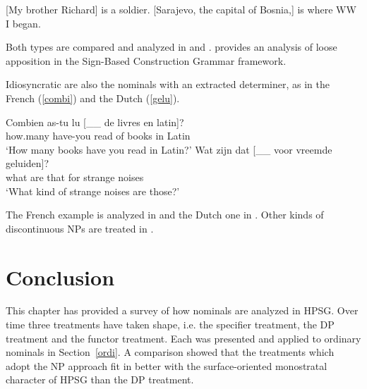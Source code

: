 \documentclass[output=paper
                ,modfonts
                ,nonflat
	        ,collection
	        ,collectionchapter
	        ,collectiontoclongg
 	        ,biblatex
                ,babelshorthands
                ,newtxmath
                ,draftmode
                ,colorlinks, citecolor=brown
]{./langsci/langscibook}
\begin{document}
\begin{exe} 
\ex\label{appo} 
\begin{xlist} 
\ex  {}[My brother Richard] is a soldier.  
\ex  {}[Sarajevo, the capital of Bosnia,] is where WW I began.
\end{xlist} 
\end{exe}

\noindent
Both types are compared and analyzed in \citet{Kim12} and \citet{Kim14}. 
\citet{VanEyndeKim16} provides an analysis of loose apposition in the 
Sign-Based Construction Grammar framework. 

Idiosyncratic are also the nominals with an extracted determiner, as in 
the French (\ref{combi}) and the Dutch (\ref{gelu}). 

\begin{exe} 
\ex\label{combi}  
\gll   Combien as-tu lu [\_\_ de livres en latin]?  \\
       how.many have-you read {} of books in Latin  \\ 
\trans `How many books have you read in Latin?' 
\ex\label{gelu}
\gll   Wat zijn dat [\_\_ voor vreemde geluiden]? \\
       what are that {} for strange noises        \\ 
\trans `What kind of strange noises are those?'  
\end{exe} 

\noindent
The French example is analyzed in \citet[20--21]{Abeilleetal04} and the Dutch one in 
\citet[47--50]{VanEynde04}. Other kinds of discontinuous NPs are treated in \citet{deKuthy2002a}. 


\section{Conclusion} 


This chapter has provided a survey of how nominals are analyzed in HPSG. 
Over time three treatments have taken shape, i.e. the specifier treatment, 
the DP treatment and the functor treatment. 
Each was presented and applied to ordinary nominals in Section~\ref{ordi}. 
A comparison showed that the treatments which adopt the NP approach fit in better with 
the surface-oriented monostratal character of HPSG than the DP treatment.
\end{document}
